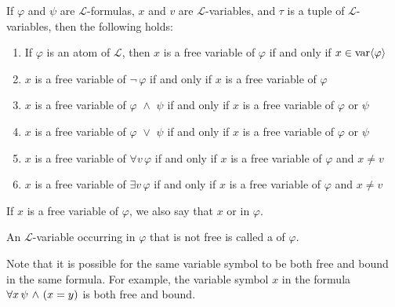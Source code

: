 \begin{dfn}
     \label{dfn:first-order-language-recursive-definition-of-free-variables}
    If \( \varphi \) and \( \psi \) are \( \mathcal{L} \)-formulas, \( x \) and \( v \) are \( \mathcal{L} \)-variables, and \( \tau \) is a tuple of \( \mathcal{L} \)-variables,
    then the following holds:
    \begin{enumerate}[topsep=2pt,label=\textup{\texttt{(\alph*)}}]
        \item If \( \varphi \) is an atom of \( \mathcal{L} \), then \( x \) is a free variable of \( \varphi \) if and only if \( x \in \operatorname{var} \langle\varphi\rangle \)
        \item \( x \) is a free variable of \( \lnot \, \varphi \) if and only if \( x \) is a free variable of \( \varphi \)
        \item \( x \) is a free variable of \( \varphi \,\,{\land}\,\, \psi \) if and only if \( x \) is a free variable of \( \varphi \) or \( \psi \)
        \item \( x \) is a free variable of \( \varphi \,\,{\lor}\,\, \psi \) if and only if \( x \) is a free variable of \( \varphi \) or \( \psi \)
        \item \( x \) is a free variable of \( \forall v \, \varphi \) if and only if \( x \) is a free variable of \( \varphi \) and \( x \neq v \)
        \item \( x \) is a free variable of \( \exists v \, \varphi \) if and only if \( x \) is a free variable of \( \varphi \) and \( x \neq v \)
    \end{enumerate}
\end{dfn}

\begin{rem}
    If \( x \) is a free variable of \( \varphi \), we also say that \( x \)  or  in \( \varphi \).
\end{rem}

\begin{dfn}
     \label{dfn:first-order-language-bound-variables}
    An \( \mathcal{L} \)-variable occurring in \( \varphi \) that is not free is called a  of \( \varphi \). 
\end{dfn}

\begin{rem}
    Note that it is possible for the same variable symbol to be both free and bound in the same formula.
    For example, the variable symbol \( x \) in the formula \( \forall x \, \psi \,\,{\land}\,\, \mleft( x = y \mright) \)
    is both free and bound.
\end{rem}


